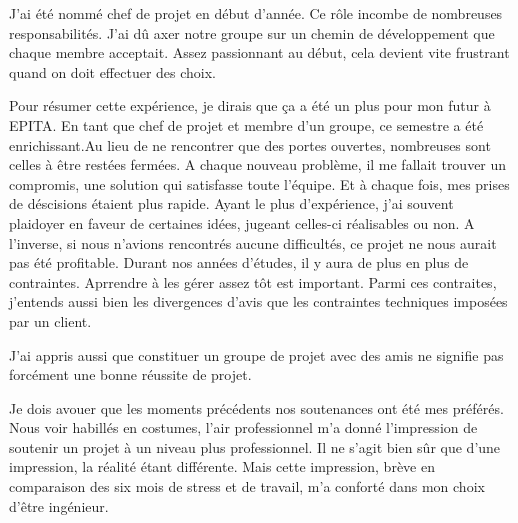 \documentclass[12pt]{article}
\begin{document}
J'ai été nommé chef de projet en début d'année. Ce rôle incombe de nombreuses responsabilités. J'ai dû axer notre groupe sur un chemin de développement que chaque membre acceptait. Assez passionnant au début, cela devient vite frustrant quand on doit effectuer des choix. 

Pour résumer cette expérience, je dirais que ça a été un plus pour mon futur à EPITA. En tant que chef de projet et membre d'un groupe, ce semestre a été enrichissant.Au lieu de ne rencontrer que des portes ouvertes, nombreuses sont celles à être restées fermées. A chaque nouveau problème, il me fallait trouver un compromis, une solution qui satisfasse toute l'équipe. Et à chaque fois, mes prises de déscisions étaient plus rapide. Ayant le plus d'expérience, j'ai souvent plaidoyer en faveur de certaines idées, jugeant celles-ci réalisables ou non. A l'inverse, si nous n'avions rencontrés aucune difficultés, ce projet ne nous aurait pas été profitable. Durant nos années d'études, il y aura de plus en plus de contraintes. Aprrendre à les gérer assez tôt est important. Parmi ces contraites, j'entends aussi bien les divergences d'avis que les contraintes techniques imposées par un client. 

J'ai appris aussi que constituer un groupe de projet avec des amis ne signifie pas forcément une bonne réussite de projet. 

Je dois avouer que les moments précédents nos soutenances ont été mes préférés. Nous voir habillés en costumes, l'air professionnel m'a donné l'impression de soutenir un projet à un niveau plus professionnel. Il ne s'agit bien sûr que d'une impression, la réalité étant différente. Mais cette impression, brève en comparaison des six mois de stress et de travail, m'a conforté dans mon choix d'être ingénieur.

\newpage
\listoffigures
\end{document}
